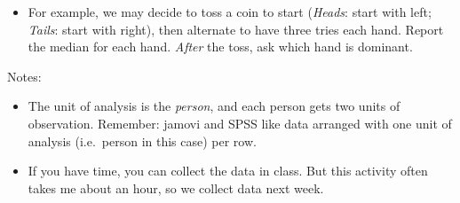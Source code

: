 \documentclass[
  11pt,
  a4paper,
  krantz2]{krantz}
\providecommand{\tightlist}{%
  \setlength{\itemsep}{0pt}\setlength{\parskip}{0pt}}
\begin{document}
\begin{itemize}
  \begin{itemize}
  \tightlist
  \item
    How do we decide which hand goes first?
  \item
    How will we determine the \emph{dominant hand}?
    (Perhaps easiest: hand we write with.)
  \item
    What if someone is ambidexterous, or only has one arm?
    (Use exclusion criteria!)
  \item
    How will be grab the ruler?
    Anyway we like, or with index finger and thumb?
  \item
    How do we measure the reaction time on the ruler?
    What is grabbing finger/thumb is not horizontal exactly?
    Top of thumb?
  \item
    Where will we start the ruler relative to fingers?
  \item
    When will we release the ruler?
    After (say) \(3\) seconds?
    After a random time?
  \item
    Will catchers be sitting or standing?
  \item
    What of the catcher drops their hand while catching?
    (Maybe arm should rest on a table?)
  \item
    How far apart should fingers be?
  \item
    Just one catch per hand, or more?
    If more, what (single) number to report: the slowest? fastest? median? mean?
  \item
    What if the catchers fails to catch the ruler: have another go? or just their bad luck, and they miss a measurement?
  \item
    Can we manage Hawthorne (no), observer effect (ask which hand is dominant \emph{after} collecting data), etc.
  \end{itemize}
\item
  For example, we may decide to toss a coin to start (\emph{Heads}: start with left; \emph{Tails}: start with right), then alternate to have three tries each hand.
  Report the median for each hand.
  \emph{After} the toss, ask which hand is dominant.
\end{itemize}

Notes:

\begin{itemize}
\tightlist
\item
  The unit of analysis is the \emph{person}, and each person gets two units of observation.
  Remember: jamovi and SPSS like data arranged with one unit of analysis (i.e.~person in this case) per row.
\item
  If you have time, you can collect the data in class.
  But this activity often takes me about an hour, so we collect data next week.
\end{itemize}
\end{document}
